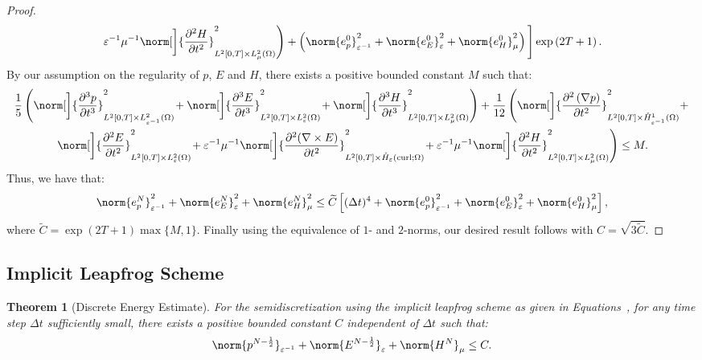 \documentclass{amsart}
\theoremstyle{thmstyleone}%
\newtheorem{theorem}{Theorem}%
\theoremstyle{thmstyletwo}%
\theoremstyle{thmstylethree}%
\DeclareMathOperator{\curl}{curl}
\begin{document}
\begin{proof}
\begin{multline*}
\left. \varepsilon^{-1} \mu^{-1} \norm[\bigg]{\dfrac{\partial^2 H}{\partial t^2}}^2_{L^2[0, T] \times L^2_\mu(\Omega)} \right) + \left( \norm{e_p^0}^2_{\varepsilon^{-1}} + \norm{e_E^0}^2_{\varepsilon} + \norm{e_H^0}^2_{\mu} \right) \Bigg] \exp \left( 2 T + 1 \right).
\end{multline*}
By our assumption on the regularity of $p$, $E$ and $H$, there exists a positive bounded constant $M$ such that:
\begin{multline*}
\dfrac{1}{5} \left( \norm[\bigg]{\dfrac{\partial^3 p}{\partial t^3}}^2_{L^2[0, T] \times L^2_{\varepsilon^{-1}}(\Omega)} \! + \norm[\bigg]{\dfrac{\partial^3 E}{\partial t^3}}^2_{L^2[0, T] \times L^2_\varepsilon(\Omega)} \! + \norm[\bigg]{\dfrac{\partial^3 H}{\partial t^3}}^2_{L^2[0, T] \times L^2_\mu(\Omega)} \right) + \dfrac{1}{12} \left( \norm[\bigg]{\dfrac{\partial^2 \left(\nabla p \right)}{\partial t^2}}^2_{L^2[0, T] \times \mathring{H}^1_{\varepsilon^{-1}}(\Omega)} + \right. \\
\left. \norm[\bigg]{\dfrac{\partial^2 E}{\partial t^2}}^2_{L^2[0, T] \times L^2_\varepsilon(\Omega)} \! + \varepsilon^{-1} \mu^{-1} \norm[\bigg]{\dfrac{\partial^2 (\nabla \times E)}{\partial t^2}}^2_{L^2[0, T] \times \mathring{H}_\varepsilon(\curl; \Omega)} \! + \varepsilon^{-1} \mu^{-1} \norm[\bigg]{\dfrac{\partial^2 H}{\partial t^2}}^2_{L^2[0, T] \times L^2_\mu(\Omega)} \right) \le M.
\end{multline*}
Thus, we have that:
\[
  \norm{e_p^N}^2_{\varepsilon^{-1}} + \norm{e_E^N}^2_{\varepsilon} + \norm{e_H^N}^2_{\mu} \le \widetilde{C} \left[ (\Delta t)^4 + \norm{e_p^0}^2_{\varepsilon^{-1}} + \norm{e_E^0}^2_{\varepsilon} + \norm{e_H^0}^2_{\mu} \right],
\]
where $\widetilde{C} = \exp(2 T +1) \max\{M, 1\}$. Finally using the equivalence of $1$- and $2$-norms, our desired result follows with $C = \sqrt{3 \widetilde{C}}$.
\end{proof}

\subsection{Implicit Leapfrog Scheme}

\begin{theorem}[Discrete Energy Estimate] \label{thm:dscrt_enrgy_estmt_lf}
  For the semidiscretization using the implicit leapfrog scheme as given in Equations~, for any time step $\Delta t$ sufficiently small, there exists a positive bounded constant $C$ independent of $\Delta t$ such that:
\[
  \norm{p^{N - \frac{1}{2}}}_{\varepsilon^{-1}} + \norm{E^{N - \frac{1}{2}}}_{\varepsilon} + \norm{H^N}_{\mu} \le C.
\]
\end{theorem}
\end{document}
